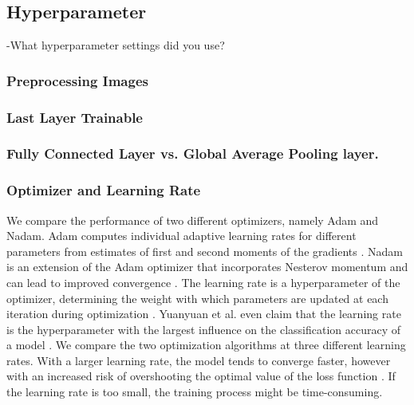 \documentclass[sn-mathphys,Numbered]{sn-jnl}%
\theoremstyle{thmstyleone}%
\theoremstyle{thmstyletwo}%
\theoremstyle{thmstylethree}%
\begin{document}
\subsection{Hyperparameter}\label{Hyperparameter}
-What hyperparameter settings did you use?
\subsubsection{Preprocessing Images}\label{Preprocessing}
\subsubsection{Last Layer Trainable}\label{laystlayer}
\subsubsection{Fully Connected Layer vs. Global Average Pooling layer.}\label{fullyConnected}
\subsubsection{Optimizer and Learning Rate}\label{learningrate}
We compare the performance of two different optimizers, namely Adam and Nadam. Adam computes individual adaptive learning rates for different parameters from estimates of first and second moments of the gradients \cite{kingma2017adam}. Nadam is an extension of the Adam optimizer that incorporates Nesterov momentum and can lead to improved convergence \cite{dozat.2016}.
The learning rate is a hyperparameter of the optimizer, determining the weight with which parameters are updated at each iteration during optimization \cite{Brownlee_2020}.
Yuanyuan et al. even claim that the learning rate is the hyperparameter with the largest influence on the classification accuracy of a model \cite{Yuanyuan_2020}. 
We compare the two optimization algorithms at three different learning rates.
With a larger learning rate, the model tends to converge faster, however with an increased risk of overshooting the optimal value of the loss function \cite{Brownlee_2020}.
If the learning rate is too small, the training process might be time-consuming.
\end{document}
